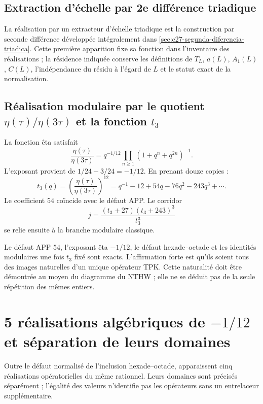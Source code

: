 \subsection{Extraction d’échelle par 2e différence triadique}

La réalisation par un extracteur d’échelle triadique est la construction par
seconde différence développée intégralement dans
\cref{sec:c27-segunda-diferencia-triadica}. Cette première apparition fixe sa
fonction dans l’inventaire des réalisations ; la résidence indiquée conserve
les définitions de \(T_L\), \(a(L)\), \(A_1(L)\), \(C(L)\), l’indépendance
du résidu à l’égard de \(L\) et le statut exact de la normalisation.

\subsection{Réalisation modulaire par le quotient \(\eta(\tau)/\eta(3\tau)\) et la fonction \(t_3\)}

La fonction êta satisfait
\[
\frac{\eta(\tau)}{\eta(3\tau)}
=q^{-1/12}\prod_{n\ge1}(1+q^n+q^{2n})^{-1}.
\]
L’exposant provient de \(1/24-3/24=-1/12\). En prenant douze copies :
\[
t_3(q)=\left(\frac{\eta(\tau)}{\eta(3\tau)}\right)^{12}
=q^{-1}-12+54q-76q^2-243q^3+\cdots.
\]
Le coefficient \(54\) coïncide avec le défaut APP. Le corridor
\[
j=\frac{(t_3+27)(t_3+243)^3}{t_3^3}
\]
se relie ensuite à la branche modulaire classique.

\begin{remark}
Le défaut APP \(54\), l’exposant êta \(-1/12\), le défaut
hexade--octade et les identités modulaires une fois \(t_3\) fixé sont exacts.
L’affirmation forte est qu’ils soient tous des images naturelles d’un unique opérateur
TPK. Cette naturalité doit être démontrée au moyen du diagramme du NTHW ; elle ne se
déduit pas de la seule répétition des mêmes entiers.
\end{remark}


\section{5 réalisations algébriques de \texorpdfstring{\(-1/12\)}{-1/12} et séparation de leurs domaines}

Outre le défaut normalisé de l’inclusion hexade--octade, apparaissent
cinq réalisations opératorielles du même rationnel. Leurs domaines sont
précisés séparément ; l’égalité des valeurs n’identifie pas les
opérateurs sans un entrelaceur supplémentaire.


